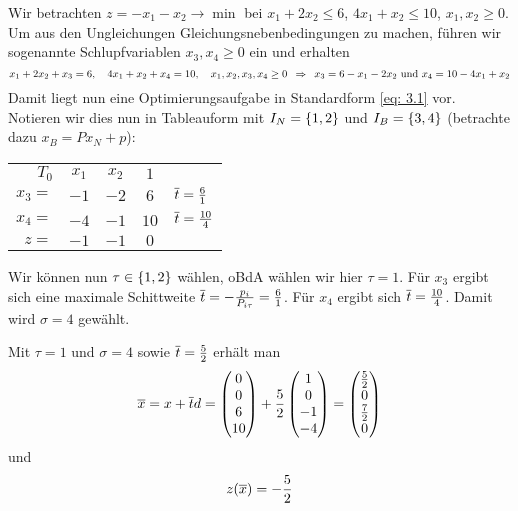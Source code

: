\begin{beispiel} %
	\label{beispiel: 3.2}
	Wir betrachten $z = -x_1 - x_2 \to \min$ bei $x_1 + 2 x_2 \le 6$, $4x_1 + x_2 \le 10$, $x_1, x_2 \ge 0$. Um aus den Ungleichungen Gleichungsnebenbedingungen zu machen, führen wir sogenannte Schlupfvariablen $x_3, x_4 \ge 0$ ein und erhalten
	\begin{equation*}
		x_1 + 2 x_2 + x_3 = 6, \quad  4x_1 + x_2 + x_4 = 10, \quad x_1, x_2, x_3, x_4 \ge 0 \\
		\enskip \Rightarrow \enskip x_3 = 6 - x_1 - 2x_2 \text{ und } x_4 = 10 - 4x_1 + x_2
	\end{equation*}
	Damit liegt nun eine Optimierungsaufgabe in Standardform \eqref{eq: 3.1} vor. Notieren wir dies nun in Tableauform mit $I_N = \left\{ 1,2 \right\}$ und $I_B = \left\{ 3,4 \right\}$ (betrachte dazu $x_B = Px_N + p$):	
	\begin{center}
		\begin{tabular}{r|cc|c l}
			$T_0$ & $x_1$ & $x_2$ & $1$ \\ \cline{1-4}
			$x_3 = $ & $-1$ & $-2$ & $6$ & {\footnotesize $\overline{t} = \frac{6}{1}$} \\ 
			$x_4 = $ & $-4$ & $-1$ & $10$ & {\footnotesize $\overline{t} = \frac{10}{4}$} \\ \cline{1-4}
			$z =$ & $-1$ & $-1$    & $0$
		\end{tabular}
	\end{center}
	Wir können nun $\tau \in \left\{ 1,2 \right\}$ wählen, oBdA wählen wir hier $\tau = 1$.
	Für $x_3$ ergibt sich eine maximale Schittweite $\overline{t} = -\frac{p_i}{P_{i \tau}} = \frac{6}{1}$. Für $x_4$ ergibt sich $\overline{t} = \frac{10}{4}$.  Damit wird $\sigma = 4$ gewählt.
	
	Mit $\tau = 1$ und $\sigma = 4$ sowie $\overline{t} = \frac{5}{2}$ erhält man
	\begin{equation*}
		\overline{x} = x + \overline{t} d = \begin{pmatrix} 0 \\ 0 \\ 6 \\ 10 \end{pmatrix} + \frac{5}{2} \begin{pmatrix} 1 \\ 0 \\ -1 \\-4 \end{pmatrix}
		= \begin{pmatrix} \frac{5}{2} \\ 0 \\ \frac{7}{2} \\ 0 \end{pmatrix}
	\end{equation*}
	und 
	\begin{equation*}
		z(\overline{x}) = -\frac{5}{2}
	\end{equation*}
\end{beispiel}

